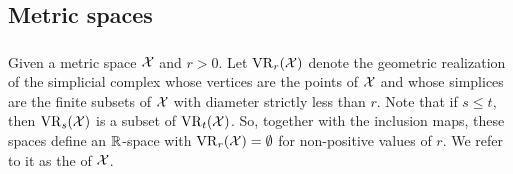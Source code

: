 %
%
%

\subsection{Metric spaces}

\subsubsection{}
Given a metric space $\mathcal{X}$ and $r > 0$.
Let $\operatorname{VR}_r(\mathcal{X})$ denote the geometric realization of the simplicial complex whose vertices are the points of $\mathcal{X}$ and whose simplices are the finite subsets of $\mathcal{X}$ with diameter strictly less than $r$.
Note that if $s \leq t$, then $\operatorname{VR}_s(\mathcal{X})$ is a subset of $\operatorname{VR}_t(\mathcal{X})$.
So, together with the inclusion maps, these spaces define an $\mathbb{R}$-space with $\operatorname{VR}_r(\mathcal{X}) = \emptyset$ for non-positive values of $r$.
We refer to it as the  of $\mathcal{X}$.

